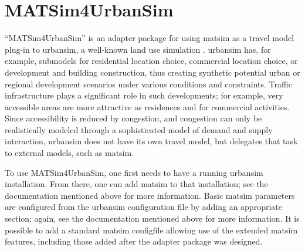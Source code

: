 \section{MATSim4UrbanSim}
\label{sec:matsim4urbansim}




``MATSim4UrbanSim'' is an adapter package for using \gls{matsim} as a travel model plug-in to \gls{urbansim}, a well-known land use simulation \citep[e.g.][see \url{http://www.urbansim.org}]{WaddellEtc2003UrbanSim}.
\gls{urbansim} has, for example, submodels for residential location choice, commercial location choice, or development and building construction, thus creating synthetic  potential urban or regional development scenarios under various conditions and constraints. 
Traffic infrastructure plays a significant role in such developments; for example, very accessible areas are more attractive as residences and for commercial activities. 
Since accessibility is reduced by congestion, and congestion can only be realistically modeled through a sophisticated model of demand and supply interaction, \gls{urbansim} does not have its own travel model, but delegates that task to external models, such as \gls{matsim}.

To use MATSim4UrbanSim, one first needs to have a running \gls{urbansim} installation. 
From there, one can add \gls{matsim} to that installation; see %
the documentation mentioned above for more information. 
Basic \gls{matsim} parameters are configured from the \gls{urbansim} configuration file by adding an appropriate section; again, see 
the documentation mentioned above for more information. 
It is possible to add a standard \gls{matsim} \gls{configfile} allowing use of the extended \gls{matsim} features, including those added after the adapter package was designed.

